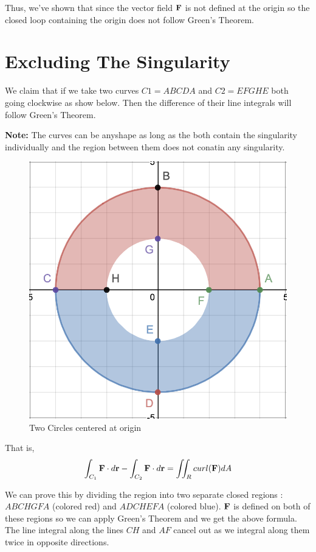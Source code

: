 Thus, we've shown that since the vector field ${\bf F}$ is not defined at the origin so the closed loop containing the origin does not follow Green's Theorem.

\pagebreak

\section{Excluding The Singularity}

We claim that if we take two curves $C1 = ABCDA$ and $C2 = EFGHE$ both going clockwise as show below.
Then the difference of their line integrals will follow Green's Theorem.

{\bf Note: } The curves can be anyshape as long as the both contain the singularity individually and the region between them does not conatin any singularity.

\begin{figure}[ht!]
    \centering
    \includegraphics[scale=0.5]{./images/lecture_20_figure_1.png}
    \caption{Two Circles centered at origin}
\end{figure}

That is, 
$$
\int_{C_1} {\bf F} \cdot d{\bf r} - \int_{C_2} {\bf F} \cdot d{\bf r} = \iint_R curl({\bf F}) dA
$$

We can prove this by dividing the region into two separate closed regions : $ABCHGFA$ (colored red) and $ADCHEFA$ (colored blue).
${\bf F}$ is defined on both of these regions so we can apply Green's Theorem and we get the above formula.
The line integral along the lines $CH$ and $AF$ cancel out as we integral along them twice in opposite directions.

